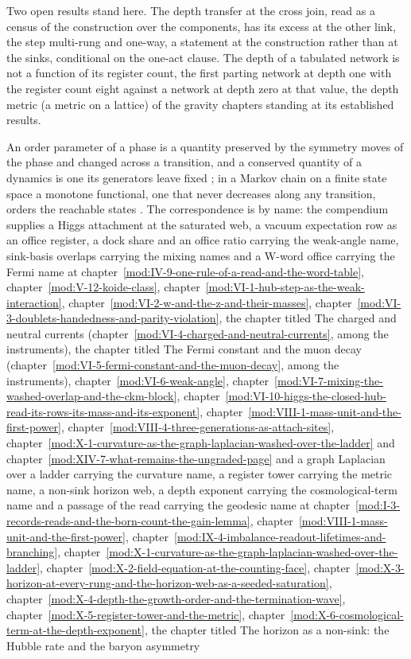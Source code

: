 Two open results stand here. The depth transfer at the cross join, read as a census of the construction over the components, has its excess at the other link, the step multi-rung and one-way, a statement at the construction rather than at the sinks, conditional on the one-act clause. The depth of a tabulated network is not a function of its register count, the first parting network at depth one with the register count eight against a network at depth zero at that value, the depth metric (a metric on a lattice) of the gravity chapters standing at its established results.
\begin{chbridge}
An order parameter of a phase is a quantity preserved by the symmetry moves of the phase and changed across a transition, and a conserved quantity of a dynamics is one its generators leave fixed \cite{Landau1937,Noether1918}; in a Markov chain on a finite state space a monotone functional, one that never decreases along any transition, orders the reachable states \cite{Kemeny1960}. The correspondence is by name: the compendium supplies a Higgs attachment at the saturated web, a vacuum expectation row as an office register, a dock share and an office ratio carrying the weak-angle name, sink-basis overlaps carrying the mixing names and a W-word office carrying the Fermi name at chapter~\ref{mod:IV-9-one-rule-of-a-read-and-the-word-table}, chapter~\ref{mod:V-12-koide-class}, chapter~\ref{mod:VI-1-hub-step-as-the-weak-interaction}, chapter~\ref{mod:VI-2-w-and-the-z-and-their-masses}, chapter~\ref{mod:VI-3-doublets-handedness-and-parity-violation}, the chapter titled The charged and neutral currents (chapter~\ref{mod:VI-4-charged-and-neutral-currents}, among the instruments), the chapter titled The Fermi constant and the muon decay (chapter~\ref{mod:VI-5-fermi-constant-and-the-muon-decay}, among the instruments), chapter~\ref{mod:VI-6-weak-angle}, chapter~\ref{mod:VI-7-mixing-the-washed-overlap-and-the-ckm-block}, chapter~\ref{mod:VI-10-higgs-the-closed-hub-read-its-rows-its-mass-and-its-exponent}, chapter~\ref{mod:VIII-1-mass-unit-and-the-first-power}, chapter~\ref{mod:VIII-4-three-generations-as-attach-sites}, chapter~\ref{mod:X-1-curvature-as-the-graph-laplacian-washed-over-the-ladder} and chapter~\ref{mod:XIV-7-what-remains-the-ungraded-page} and a graph Laplacian over a ladder carrying the curvature name, a register tower carrying the metric name, a non-sink horizon web, a depth exponent carrying the cosmological-term name and a passage of the read carrying the geodesic name at chapter~\ref{mod:I-3-records-reads-and-the-born-count-the-gain-lemma}, chapter~\ref{mod:VIII-1-mass-unit-and-the-first-power}, chapter~\ref{mod:IX-4-imbalance-readout-lifetimes-and-branching}, chapter~\ref{mod:X-1-curvature-as-the-graph-laplacian-washed-over-the-ladder}, chapter~\ref{mod:X-2-field-equation-at-the-counting-face}, chapter~\ref{mod:X-3-horizon-at-every-rung-and-the-horizon-web-as-a-seeded-saturation}, chapter~\ref{mod:X-4-depth-the-growth-order-and-the-termination-wave}, chapter~\ref{mod:X-5-register-tower-and-the-metric}, chapter~\ref{mod:X-6-cosmological-term-at-the-depth-exponent}, the chapter titled The horizon as a non-sink: the Hubble rate and the baryon asymmetry 
\end{chbridge}
